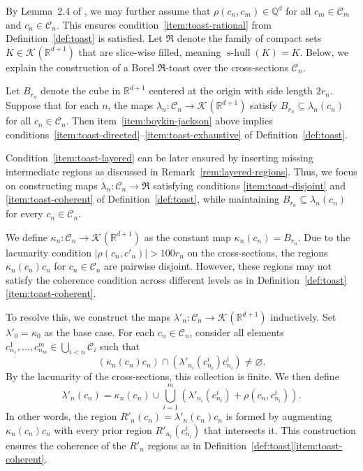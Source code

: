 \documentclass[12pt]{paper}
\numberwithin{equation}{section}
\theoremstyle{plain}
\theoremstyle{definition}
\newcommand{\Q}{\mathbb{Q}}
\newcommand{\R}{\mathbb{R}}
\newcommand{\mfR}{\mathfrak{R}}
\newcommand{\vietoris}[2][]{\mathcal{K}_{#1}(#2)}
\DeclareMathOperator{\shull}{\mathrm{s-hull}}
\begin{document}
By Lemma~2.4 of \cite{Slutsky}, we may further assume that \(\rho(c_n, c_m) \in \Q^{d}\) for
all \(c_m \in \mathcal{C}_m\) and \(c_n \in \mathcal{C}_n\). This ensures
condition~\eqref{item:toast-rational} from Definition~\ref{def:toast} is satisfied. Let \(\mfR\)
denote the family of compact sets \(K \in \vietoris{\R^{d+1}}\) that are slice-wise filled,
meaning \(\shull(K) = K\). Below, we explain the construction of a Borel \(\mfR\)-toast over the
cross-sections \(\mathcal{C}_n\).

Let \(B_{r_{n}}\) denote the cube in \(\R^{d+1}\) centered at the origin with side length
\(2r_{n}\).  Suppose that for each \(n\), the maps
\(\lambda_{n} : \mathcal{C}_{n} \to \vietoris{\R^{d+1}}\) satisfy
\(B_{r_{n}} \subseteq \lambda_{n}(c_{n})\) for all \(c_{n} \in \mathcal{C}_{n}\). Then
item~\eqref{item:boykin-jackson} above implies
conditions~\eqref{item:toast-directed}--\eqref{item:toast-exhaustive} of Definition~\ref{def:toast}.

Condition~\eqref{item:toast-layered} can be later ensured by inserting missing intermediate regions
as discussed in Remark~\ref{rem:layered-regions}. Thus, we focus on constructing maps
\(\lambda_{n} : \mathcal{C}_{n} \to \mfR\) satisfying conditions \eqref{item:toast-disjoint} and
\eqref{item:toast-coherent} of Definition~\ref{def:toast}, while maintaining
\(B_{r_{n}} \subseteq \lambda_{n}(c_{n})\) for every \(c_{n} \in \mathcal{C}_{n}\).

We define \(\kappa_{n} : \mathcal{C}_{n} \to \vietoris{\R^{d+1}}\) as the constant map
\(\kappa_{n}(c_{n}) = B_{r_{n}}\). Due to the lacunarity condition
\(|\rho(c_{n}, c'_{n})| > 100 r_{n}\) on the cross-sections, the regions \(\kappa_{n}(c_{n}) c_{n}\)
for \(c_{n} \in \mathcal{C}_{n}\) are pairwise disjoint. However, these regions may not satisfy the
coherence condition across different levels as in
Definition~\ref{def:toast}\eqref{item:toast-coherent}.

To resolve this, we construct the maps \(\lambda'_{n} : \mathcal{C}_{n} \to \vietoris{\R^{d+1}}\)
inductively. Set \(\lambda'_{0} = \kappa_{0}\) as the base case. For each
\(c_{n} \in \mathcal{C}_{n}\), consider all elements
\(c^{1}_{n_{1}}, \ldots, c^{m}_{n_{m}} \in \bigcup_{i<n}\mathcal{C}_{i}\) such that
\[(\kappa_{n}(c_{n})c_{n}) \cap (\lambda'_{n_{i}}(c^{i}_{n_{i}})c^{i}_{n_{i}}) \ne \varnothing.\]
By the lacunarity of the cross-sections, this collection is finite. We then define
\begin{equation}
  \label{eq:fusion}
  \lambda'_{n}(c_{n}) = \kappa_{n}(c_{n}) \cup \bigcup_{i=1}^{m}(\lambda'_{n_{i}}(c^{i}_{n_{i}}) + \rho(c_{n},c^{i}_{n_{i}})).
\end{equation}
In other words, the region \(R'_{n}(c_{n}) = \lambda'_{n}(c_{n})c_{n}\) is formed by augmenting
\(\kappa_{n}(c_{n})c_{n}\) with every prior region \(R'_{n_{i}}(c^{i}_{n_{i}})\) that intersects
it. This construction ensures the coherence of the \(R'_{n}\) regions as in
Definition~\ref{def:toast}\eqref{item:toast-coherent}.
\end{document}
